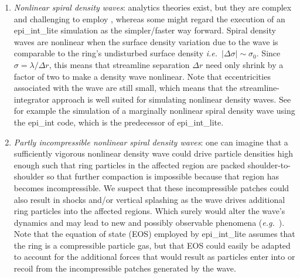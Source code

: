 \documentclass[preprint]{aastex62}
\begin{document}
\begin{enumerate}

\item {\it Nonlinear spiral density waves}: analytics theories exist, but they are complex and challenging to employ
\citep{SYL85, BGT86}, whereas some might regard the execution of an epi\_int\_lite simulation 
as the simpler/faster way forward. Spiral density waves are nonlinear
when the surface density variation due to the wave is comparable to the ring's undisturbed surface density
{\it i.e.}\ $|\Delta\sigma|\sim\sigma_0$. Since $\sigma=\lambda/\Delta r$, this means that 
streamline separation $\Delta r$ need only shrink by a factor of two to make a density wave nonlinear.
Note that eccentricities associated with the wave are still small, 
which means that the streamline-integrator approach is well suited for simulating 
nonlinear density waves. See for example the \cite{Fetal16B} simulation
of a marginally nonlinear spiral density wave using the epi\_int code,
which is the predecessor of epi\_int\_lite.

\item {\it Partly incompressible nonlinear spiral density waves}: one can imagine that a sufficiently vigorous nonlinear
density wave could drive particle densities high enough such that ring particles in the affected region are packed 
shoulder-to-shoulder so that further compaction is impossible
because that region has becomes incompressible. We suspect that these incompressible
patches could also result in shocks and/or vertical splashing as the wave drives 
additional ring particles into the affected regions. Which surely would alter the wave's dynamics and may
lead to new and possibly observable phenomena ({\it e.g.}\ \citealt{BGT85}). Note that the equation of state (EOS) employed by
epi\_int\_lite assumes that the ring is a compressible particle gas, but that EOS could easily be adapted
to account for the additional forces that would result as particles enter into or recoil
from the incompressible patches generated by the wave. 


\end{enumerate}
\end{document}
